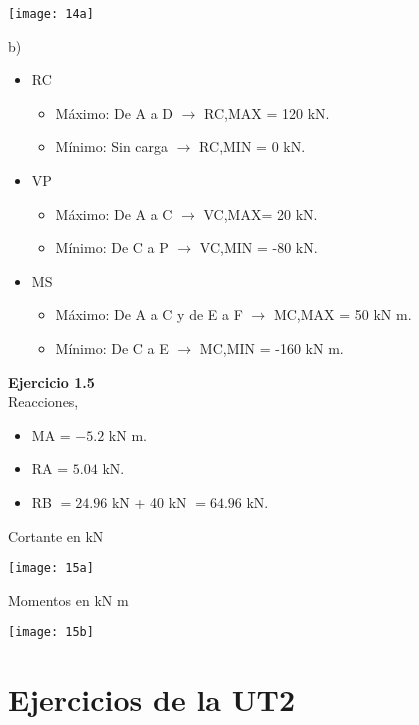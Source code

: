 	\begin{center}
		\texttt{[image: 14a]}
	\end{center}
b)
\begin{itemize}
\item RC
\begin{itemize}
	\item Máximo: De A a D $\rightarrow$ RC,MAX = 120 kN.
    \item Mínimo: Sin carga $\rightarrow$ RC,MIN = 0 kN.
    \end{itemize}
\item VP
\begin{itemize}
	\item Máximo: De A a C $\rightarrow$ VC,MAX= 20 kN.
    \item Mínimo: De C a P $\rightarrow$ VC,MIN = -80 kN.
    \end{itemize}
\item MS
\begin{itemize}
	\item Máximo: De A a C y de E a F $\rightarrow$ MC,MAX = 50 kN m.
   \item Mínimo: De C a E $\rightarrow$ MC,MIN = -160 kN m.
\end{itemize}
\end{itemize}



\textbf{Ejercicio 1.5}\\
%
Reacciones,
\begin{itemize}
\item MA = $-5.2$ kN m.
\item  RA = $5.04$ kN.
\item RB $= 24.96$ kN + 40 kN  $= 64.96$ kN.
\end{itemize}
%


Cortante en kN

\begin{center}
	\texttt{[image: 15a]}
\end{center}

Momentos en kN m
 
 \begin{center}
 	\texttt{[image: 15b]}
 \end{center}



\section{Ejercicios de la UT2}




